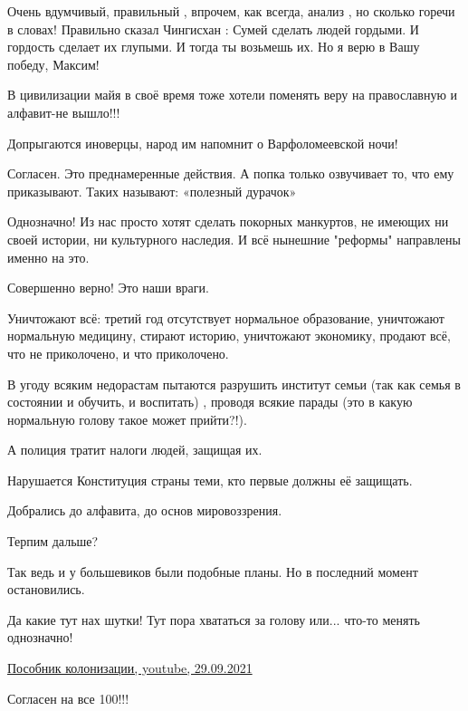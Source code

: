 \begin{itemize}

Очень вдумчивый, правильный , впрочем, как всегда, анализ , но сколько горечи в
словах! Правильно сказал Чингисхан : Сумей сделать людей гордыми. И гордость
сделает их глупыми. И тогда ты возьмешь их. Но я верю в Вашу победу, Максим!


В цивилизации майя в своё время тоже хотели поменять веру на православную и
алфавит-не вышло!!!

Допрыгаются иноверцы, народ им напомнит о Варфоломеевской ночи!


Согласен. Это преднамеренные действия. А попка только озвучивает то, что ему
приказывают. Таких называют: «полезный дурачок»


Однозначно! Из нас просто хотят сделать покорных манкуртов, не имеющих ни своей
истории, ни культурного наследия. И всё нынешние "реформы" направлены именно на
это.


Совершенно верно! Это наши враги.

Уничтожают всё: третий год отсутствует нормальное образование, уничтожают
нормальную медицину, стирают историю, уничтожают экономику, продают всё, что не
приколочено, и что приколочено.

В угоду всяким недорастам пытаются разрушить институт семьи (так как семья в
состоянии и обучить, и воспитать) , проводя всякие парады (это в какую
нормальную голову такое может прийти?!).

А полиция тратит налоги людей, защищая их.

Нарушается Конституция страны теми, кто первые должны её защищать.

Добрались до алфавита, до основ мировоззрения.

Терпим дальше?


Так ведь и у большевиков были подобные планы. Но в последний момент
остановились.


Да какие тут нах шутки!  Тут пора хвататься за голову или... что-то менять
однозначно!


\href{https://youtu.be/6FeMEGJ4WzU}{%
Пособник колонизации, youtube, 29.09.2021%
}

Согласен на все 100!!!

\end{itemize} %

